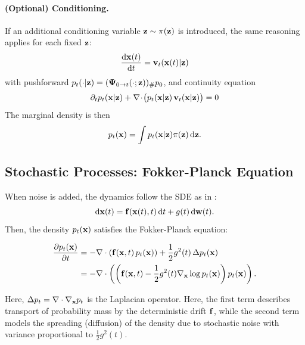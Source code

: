 \paragraph{(Optional) Conditioning.}
If an additional conditioning variable ${\mathbf{z}} \sim \pi({\mathbf{z}})$ is introduced, the same reasoning applies for each fixed ${\mathbf{z}}$:
\[
\frac{\mathop{}\!\mathrm{d} {\mathbf{x}}(t)}{\mathop{}\!\mathrm{d} t}={\mathbf{v}}_t({\mathbf{x}}(t)|{\mathbf{z}})
\]
with pushforward $p_t(\cdot|{\mathbf{z}})=({\bm{\Psi}}_{0\to t}(\cdot;{\mathbf{z}}))_{\#}p_0$, and continuity equation
\[
\partial_t p_t({\mathbf{x}}|{\mathbf{z}})+\nabla\!\cdot\!\big(p_t({\mathbf{x}}|{\mathbf{z}})\,{\mathbf{v}}_t({\mathbf{x}}|{\mathbf{z}})\big)=0
\]
The marginal density is then 
\[
p_t({\mathbf{x}})=\int p_t({\mathbf{x}}|{\mathbf{z}})\pi({\mathbf{z}})\mathop{}\!\mathrm{d}{\mathbf{z}}.
\]









\subsection{Stochastic Processes: Fokker-Planck Equation}\label{subsec:cov-fpe}

When noise is added, the dynamics follow the SDE as in :
\[
\mathop{}\!\mathrm{d} {\mathbf{x}}(t) = {\mathbf{f}}({\mathbf{x}}(t), t)\mathop{}\!\mathrm{d} t + g(t)\mathop{}\!\mathrm{d} {\mathbf{w}}(t).
\]
Then, the density $ p_t({\mathbf{x}}) $ satisfies the Fokker-Planck equation:
\begin{mdframed}
    \begin{align*}
    \frac{\partial p_t({\mathbf{x}})}{\partial t}
&= - \nabla \cdot \left( {\mathbf{f}}({\mathbf{x}}, t)\, p_t({\mathbf{x}}) \right)
+ \frac{1}{2} g^2(t)\, \Delta p_t({\mathbf{x}})
\\& = - \nabla \cdot \left(  \left({{\mathbf{f}}({\mathbf{x}}, t)}-{\frac{1}{2} g^2(t) \nabla_{\mathbf{x}} \log p_t({\mathbf{x}})}\right) p_t({\mathbf{x}})\right).
\end{align*}
\end{mdframed}
Here, $ \Delta p_t = \nabla \cdot \nabla_{\mathbf{x}} p_t $ is the Laplacian operator.
Here, the first term describes transport of probability mass by the deterministic drift ${\mathbf{f}}$, while the second term models the spreading (diffusion) of the density due to stochastic noise with variance proportional to $\tfrac{1}{2} g^2(t) $.

